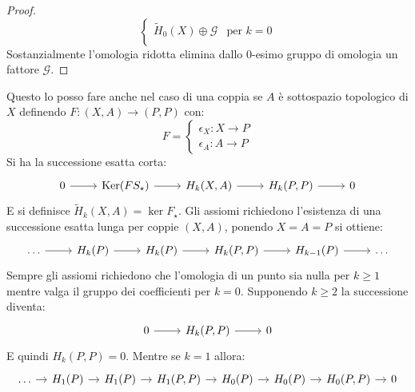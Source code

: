 \begin{proof}
\[\begin{cases}
      \tilde{H}_0(X) \oplus \mathcal{G} & \text{per } k = 0 \\
    \end{cases}
  \]
  Sostanzialmente l'omologia ridotta elimina dallo $ 0 $-esimo
  gruppo di omologia un fattore $ \mathcal{G} $.
\end{proof}
\eproof
Questo lo posso fare anche nel caso di una coppia se $ A $ è sottospazio
  topologico di $ X $ definendo $ F \colon (X, A) \to (P,P) $ con:
  \[
    F =
    \begin{cases}
      \epsilon_X \colon X \to P \\
      \epsilon_A \colon A \to P
    \end{cases}
  \]
  Si ha la successione esatta corta:
  \[
    \begin{tikzcd}
      0 \arrow{r}{}        & \ker{FS_\star} \arrow{r}{} & H_k(X, A) \arrow{r}{} & H_k(P, P) \arrow{r}{} & 0
    \end{tikzcd}
  \]
  E si definisce $ \tilde{H}_k(X,A) = \ker{F_\star} $.
  Gli assiomi richiedono l'esistenza di una successione esatta lunga per coppie $ (X,A) $,
  ponendo $ X = A = P $ si ottiene:
  \[
    \begin{tikzcd}
      \dots \arrow{r}{}        & H_k(P) \arrow{r}{}    & H_k(P) \arrow{r}{}    & H_k(P,P) \arrow{r}{}  & H_{k-1}(P) \arrow{r}{} & \dots
    \end{tikzcd}
  \]
  Sempre gli assiomi richiedono che l'omologia di un punto sia nulla per
  $ k \geq 1 $ mentre valga il gruppo dei coefficienti per $ k = 0 $. Supponendo
  $ k \geq 2 $ la successione diventa:
  \[
    \begin{tikzcd}
       0 \arrow{r}{} & H_k(P,P) \arrow{r}{}  & 0
    \end{tikzcd}
  \]
  E quindi $ H_k(P, P) = 0 $. Mentre se $ k = 1 $ allora:
  \[
    \begin{tikzcd}[nodes={column sep=10pt}]
      \dots \arrow{r}{}        & H_1(P) \arrow{r}{}    & H_1(P) \arrow{r}{}    & H_1(P,P) \arrow{r}{}  & H_{0}(P) \arrow{r}{}   &
      H_{0}(P) \arrow{r}{} & H_{0}(P,P) \rar       & 0
    \end{tikzcd}
  \]
